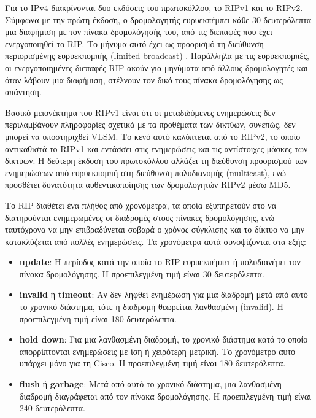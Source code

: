\documentclass{EdipyLabs} %
\begin{document}
Για το IPv4 διακρίνονται δυο εκδόσεις του πρωτοκόλλου, το RIPv1 και το RIPv2. Σύμφωνα με την πρώτη έκδοση, ο δρομολογητής ευρυεκπέμπει κάθε 30 δευτερόλεπτα μια διαφήμιση με τον πίνακα δρομολόγησής του, από τις διεπαφές που έχει ενεργοποιηθεί το RIP. Το μήνυμα αυτό έχει ως προορισμό τη διεύθυνση περιορισμένης ευρυεκπομπής (limited broadcast) . Παράλληλα με τις ευρυεκπομπές, οι ενεργοποιημένες διεπαφές RIP ακούν για μηνύματα από άλλους δρομολογητές και όταν λάβουν μια διαφήμιση, στέλνουν τον δικό τους πίνακα δρομολόγησης ως απάντηση. 

Βασικό μειονέκτημα του RIPv1 είναι ότι οι μεταδιδόμενες ενημερώσεις δεν περιλαμβάνουν πληροφορίες σχετικά με τα προθέματα των δικτύων, συνεπώς, δεν μπορεί να υποστηριχθεί VLSM. Το κενό αυτό καλύπτεται από το RIPv2, το οποίο αντικαθιστά το RIPv1 και εντάσσει στις ενημερώσεις και τις αντίστοιχες μάσκες των δικτύων. Η δεύτερη έκδοση του πρωτοκόλλου αλλάζει τη διεύθυνση προορισμού των ενημερώσεων από ευρυεκπομπή στη διεύθυνση πολυδιανομής  (multicast), ενώ προσθέτει δυνατότητα αυθεντικοποίησης των δρομολογητών RIPv2 μέσω MD5.

Το RIP διαθέτει ένα πλήθος από χρονόμετρα, τα οποία εξυπηρετούν στο να διατηρούνται ενημερωμένες οι διαδρομές στους πίνακες δρομολόγησης, ενώ ταυτόχρονα να μην επιβραδύνεται σοβαρά ο χρόνος σύγκλισης και το δίκτυο να μην κατακλύζεται από πολλές ενημερώσεις. Τα χρονόμετρα αυτά συνοψίζονται στα εξής:~
\begin{itemize}
	\item \textbf{update}: H περίοδος κατά την οποία το RIP ευρυεκπέμπει ή πολυδιανέμει τον πίνακα δρομολόγησης. Η προεπιλεγμένη τιμή είναι 30 δευτερόλεπτα.
	\item \textbf{invalid} ή \textbf{timeout}: Αν δεν ληφθεί ενημέρωση για μια διαδρομή μετά από αυτό το χρονικό διάστημα, τότε η διαδρομή θεωρείται λανθασμένη (invalid). Η προεπιλεγμένη τιμή είναι 180 δευτερόλεπτα.
	\item \textbf{hold down}: Για μια λανθασμένη διαδρομή, το χρονικό διάστημα κατά το οποίο απορρίπτονται ενημερώσεις με ίση ή χειρότερη μετρική. Το χρονόμετρο αυτό υπάρχει μόνο για τη Cisco. Η προεπιλεγμένη τιμή είναι 180 δευτερόλεπτα. 
	\item \textbf{flush} ή \textbf{garbage}: Μετά από αυτό το χρονικό διάστημα, μια λανθασμένη διαδρομή διαγράφεται από τον πίνακα δρομολόγησης. Η προεπιλεγμένη τιμή είναι 240 δευτερόλεπτα.
	
\end{itemize}
\end{document}
